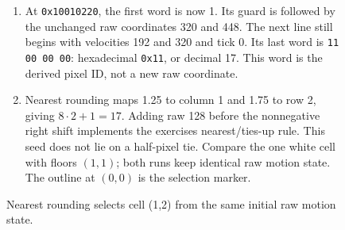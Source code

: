 \begin{figure}[htbp]
\begin{minipage}{\linewidth}
\begin{enumerate}
      \item At \texttt{0x10010220}, the first word is now 1. Its guard is followed by the unchanged raw coordinates 320 and 448. The next line still begins with velocities 192 and 320 and tick 0. Its last word is \texttt{11 00 00 00}: hexadecimal \texttt{0x11}, or decimal 17. This word is the derived pixel ID, not a new raw coordinate.
      \item Nearest rounding maps 1.25 to column 1 and 1.75 to row 2, giving $8\cdot2+1=17$. Adding raw 128 before the nonnegative right shift implements the exercise\textquotesingle s nearest/ties-up rule. This seed does not lie on a half-pixel tie. Compare the one white cell with floor\textquotesingle s $(1,1)$; both runs keep identical raw motion state. The outline at $(0,0)$ is the selection marker.
    \end{enumerate}
  \end{minipage}
  \caption{Nearest rounding selects cell (1,2) from the same initial raw motion state.}
  \label{capture:012-fixed-point-ball-f02-nearest}
  \label{ball-f02-nearest}
\end{figure}
\par
